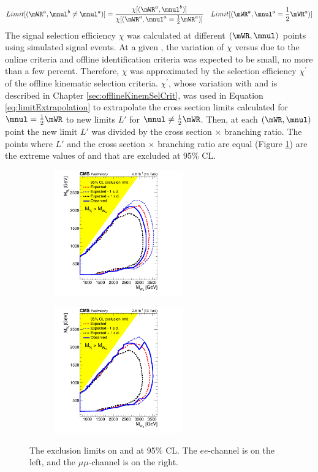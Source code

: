 \begin{equation}
	Limit[(\mWR^{a}, \mnul^{b} \neq \mnul^{a})] = \frac{\chi[(\mWR^{a}, \mnul^{b})]}{\chi[(\mWR^{a}, \mnul^{a} = \frac{1}{2}\mWR^{a})]} \quad Limit[(\mWR^{a}, \mnul^{a} = \frac{1}{2}\mWR^{a})]
\label{eq:limitExtrapolation}
\end{equation}
The signal selection efficiency $\chi$ was calculated at different $(\mWR,\mnul)$ points using simulated signal events.  At a given 
\mWR, the variation of $\chi$ versus \mnul due to the online criteria and offline identification criteria was expected to be small, no 
more than a few percent.  Therefore, $\chi$ was approximated by the selection efficiency $\chi^'$ of the offline kinematic selection 
criteria.  $\chi^'$, whose variation with \mWR and \mnul is described in Chapter \ref{sec:offlineKinemSelCrit}, was used in Equation 
\ref{eq:limitExtrapolation} to extrapolate the cross section limits calculated for $\mnul = \frac{1}{2}\mWR$ to new limits $L'$ for 
$\mnul \neq \frac{1}{2}\mWR$.  Then, at each $(\mWR,\mnul)$ point the new limit $L'$ was divided by the cross section $\times$ branching 
ratio.  The points where $L'$ and the cross section $\times$ branching ratio are equal (Figure \ref{fig:twoDimLimits}) are the extreme 
values of \mnul and \mWR that are excluded at 95\% CL.

\begin{figure}
	\centering
	\begin{subfigure}[t]{2.2in}
		\centering
		\includegraphics[width=2.2in]{figures/lim2dWReejj_SHv19700toysAprilTwentyThree_exclusionOverlayWithExpPlusMinusOneSigma.png}
	\end{subfigure}
	\thickspace
	\begin{subfigure}[t]{2.2in}
		\centering
		\includegraphics[width=2.2in]{figures/lim2dWRmumujj_SHv19700toysAprilTwentyThree_exclusionOverlayWithExpPlusMinusOneSigma.png}
	\end{subfigure}
	\caption{The exclusion limits on \mWR and \mnul at 95\% CL.  The $ee$-channel is on the left, and the $\mu\mu$-channel is on 
	the right.}
	\label{fig:twoDimLimits}
\end{figure}

